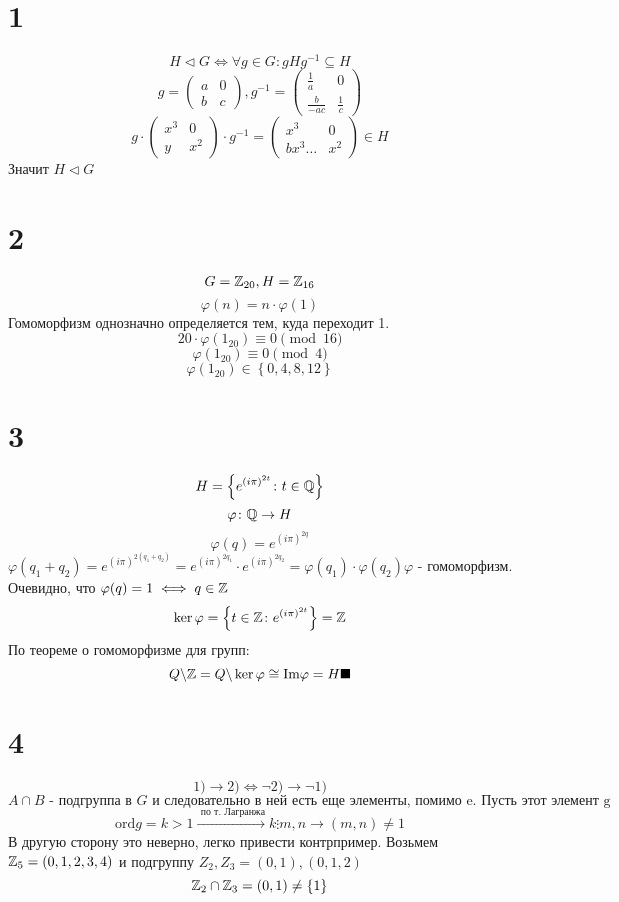 

\section*{1}
 	$$H \vartriangleleft G\iff \forall g\in G \colon gHg^{-1}\subseteq H$$
 	$$g = \begin{pmatrix}a & 0 \\b & c\end{pmatrix}, g^{-1}=  \begin{pmatrix}\frac1a & 0 \\\frac{b}{-ac} & \frac1c\end{pmatrix}$$
 	$$g\cdot\begin{pmatrix}
 		x^3 & 0 \\
 		y & x^2
 	\end{pmatrix}\cdot g^{-1}=\begin{pmatrix}
 	x^3 & 0 \\
 	bx^3\dots & x^2
 	\end{pmatrix} \in H $$
 	Значит $H \vartriangleleft G$
 	\section*{2}
 	$$G= \mathbb{Z}_{20}, H=\mathbb{Z}_{16}$$
 	$$\varphi(n) = n\cdot\varphi(1)$$
 	Гомоморфизм однозначно определяется тем, куда переходит 1.
 	$$20\cdot\varphi(1_{20}) \equiv 0\pmod {16}$$
 	$$\varphi(1_{20}) \equiv 0\pmod {4}$$
 	$$\varphi(1_{20}) \in \left\{0, 4, 8, 12\right\}$$
 	\section*{3}
 	$$H = \left\{e^{(i\pi)^{2t}}\colon t\in \mathbb{Q}\right\}$$
 	$$\varphi \colon \mathbb{Q}\to H$$
 	$$\varphi(q) =e^{(i\pi)^{2q}} $$
 	$$\varphi(q_1+q_2) = e^{(i\pi)^{2(q_1+q_2)}} =e^{(i\pi)^{2q_1}}\cdot e^{(i\pi)^{2q_2}} = \varphi(q_1)\cdot\varphi(q_2) \varphi\text{ - гомоморфизм.}$$
 	Очевидно, что $\varphi(q) = 1\iff q\in\mathbb{Z}$
 	$$\ker\varphi = \left\{t\in \mathbb{Z}\colon e^{(i\pi)^{2t}}\right\}=  \mathbb{Z}$$ 
 	По теореме о гомоморфизме для групп: $$Q\backslash \mathbb{Z} =Q\backslash \ker\varphi  \cong  \text{Im}\varphi = H \blacksquare$$
 	\section*{4}
 	$$1)\to 2) \iff \neg2)\to \neg1)$$
 	$$A\cap B \text{ - подгруппа в }G \text{ и следовательно в ней есть еще элементы, помимо e. Пусть этот элемент g}$$
 	$$\text{ord}g = k >1\overset{\text{ по т. Лагранжа}}{\to} k\vdots m, n \to (m,n)\ne 1$$
  В другую сторону это неверно, легко привести контрпример. Возьмем $\mathbb{Z}_5 = (0, 1, 2, 3, 4)$ и подгруппу $Z_2, Z_3 = (0,1), (0, 1, 2 )$
  $$\mathbb{Z}_2\cap\mathbb{Z}_3 = (0,1)\ne \left\{1\right\} $$
